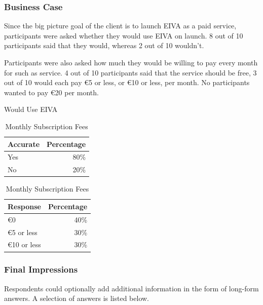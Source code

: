 \documentclass{article}
\begin{document}
\subsubsection{Business Case}

Since the big picture goal of the client is to launch EIVA as a paid service, participants were asked whether they would use EIVA on launch. 8 out of 10 participants said that they would, whereas 2 out of 10 wouldn't.

Participants were also asked how much they would be willing to pay every month for such as service. 4 out of 10 participants said that the service should be free, 3 out of 10 would each pay €5 or less, or €10 or less, per month. No participants wanted to pay €20 per month.

\begin{table}[!htb]
	\begin{minipage}{.5\linewidth}
		\caption{Would Use EIVA}
		\centering
		\begin{tabular}{lr}
			\hline
			\textbf{Accurate} & \textbf{Percentage} \\
			\hline
			Yes               & 80\%                \\
			No                & 20\%                \\
			\hline
		\end{tabular}
	\end{minipage}%
	\hspace{.1cm}
	\begin{minipage}{.5\linewidth}
		\centering
		\caption{Monthly Subscription Fees}
		\begin{tabular}{lr}
			\hline
			\textbf{Response} & \textbf{Percentage} \\
			\hline
			€0              & 40\%                \\
			€5 or less      & 30\%                \\
			€10 or less     & 30\%                \\
			\hline
		\end{tabular}
	\end{minipage} 
\end{table}

\subsubsection{Final Impressions}

Respondents could optionally add additional information in the form of long-form answers. A selection of answers is listed below.
\end{document}
